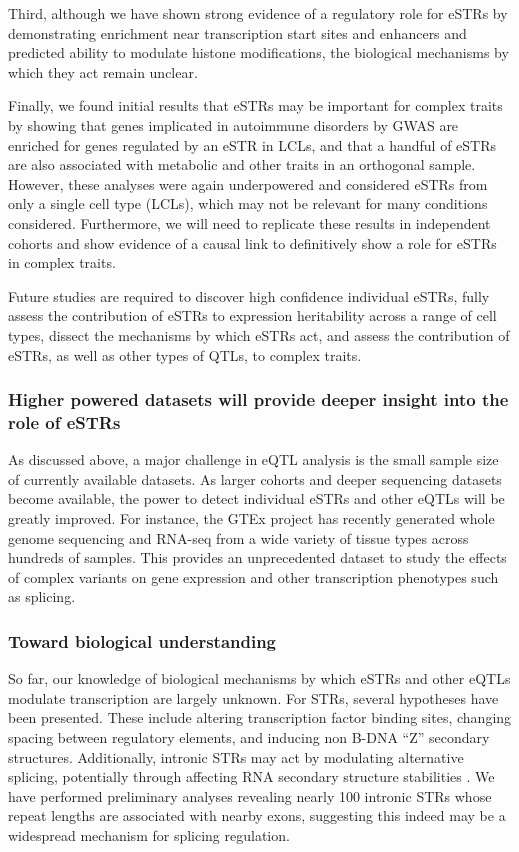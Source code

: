 Third, although we have shown strong evidence of a regulatory role for eSTRs by demonstrating enrichment near transcription start sites and enhancers and predicted ability to modulate histone modifications, the biological mechanisms by which they act remain unclear.

Finally, we found initial results that eSTRs may be important for complex traits by showing that genes implicated in autoimmune disorders by GWAS are enriched for genes regulated by an eSTR in LCLs, and that a handful of eSTRs are also associated with metabolic and other traits in an orthogonal sample. However, these analyses were again underpowered and considered eSTRs from only a single cell type (LCLs), which may not be relevant for many conditions considered. Furthermore,  we will need to replicate these results in independent cohorts and show evidence of a causal link to definitively show a role for eSTRs in complex traits.

Future studies are required to discover high confidence individual eSTRs, fully assess the contribution of eSTRs to expression heritability across a range of cell types, dissect the mechanisms by which eSTRs act, and assess the contribution of eSTRs, as well as other types of QTLs, to complex traits.

\subsubsection{Higher powered datasets will provide deeper insight into the role of eSTRs}
As discussed above, a major challenge in eQTL analysis is the small sample size of currently available datasets. As larger cohorts and deeper sequencing datasets become available, the power to detect individual eSTRs and other eQTLs will be greatly improved. For instance, the GTEx project \cite{ArdlieDelucaSegreEtAl2015} has recently generated whole genome sequencing and RNA-seq from a wide variety of tissue types across hundreds of samples. This provides an unprecedented dataset to study the effects of complex variants on gene expression and other transcription phenotypes such as splicing. 

\subsubsection{Toward biological understanding}
So far, our knowledge of biological mechanisms by which eSTRs and other eQTLs modulate transcription are largely unknown. For STRs, several hypotheses have been presented. These include altering transcription factor binding sites, changing spacing between regulatory elements, and inducing non B-DNA ``Z'' secondary structures. Additionally, intronic STRs may act by modulating alternative splicing, potentially through affecting RNA secondary structure stabilities \cite{HefferonGromanYurkEtAl2004}. We have performed preliminary analyses revealing nearly 100 intronic STRs whose repeat lengths are associated with nearby exons, suggesting this indeed may be a widespread mechanism for splicing regulation.

